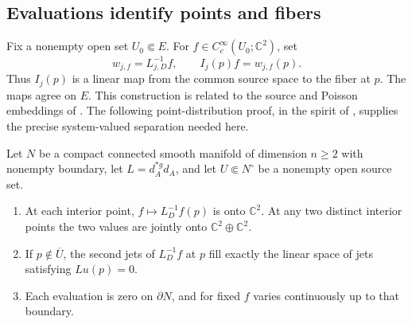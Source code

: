 \subsection{Evaluations identify points and fibers}

Fix a nonempty open set \(U_0\Subset E\).  For
\(f\in C_c^\infty(U_0;\mathbb C^2)\), set
\begin{equation}\label{bdy:source-evaluations}
 w_{j,f}=L_{j,D}^{-1}f,\qquad I_j(p)f=w_{j,f}(p).
\end{equation}
Thus \(I_j(p)\) is a linear map from the common source space to the
fiber at \(p\).  The maps agree on \(E\).  This construction is
related to the source and Poisson embeddings of
\cite[Section~6.1 and Appendix~A]{LLS20}.  The following
point-distribution proof, in the spirit of
\cite[Chapter~III, Section~3]{Malgrange1956}, supplies the precise
system-valued separation needed here.

\begin{lemma}\label{bdy:evaluations}
Let \(N\) be a compact connected smooth manifold of dimension
\(n\ge2\) with nonempty boundary, let \(L=d_A^{*g}d_A\), and let
\(U\Subset N^\circ\) be a nonempty open source set.
\begin{enumerate}
\item At each interior point, \(f\mapsto L_D^{-1}f(p)\) is onto
\(\mathbb C^2\).  At any two distinct interior points the two
values are jointly onto \(\mathbb C^2\oplus\mathbb C^2\).
\item If \(p\notin\overline U\), the second jets of \(L_D^{-1}f\)
at \(p\) fill exactly the linear space of jets satisfying
\(Lu(p)=0\).
\item Each evaluation is zero on \(\partial N\), and for fixed
\(f\) varies continuously up to that boundary.
\end{enumerate}
\end{lemma}

